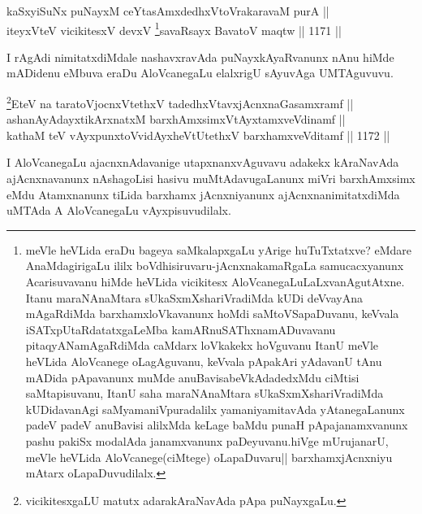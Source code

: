 
\begin{shl}
kaSxyiSuNx puNayxM ceYtasAmxdedhxVtoVrakaravaM purA ||  \\
iteyxVteV vicikitesxV devxV \footnote{meVle heVLida eraDu bageya saMkalapxgaLu yArige huTuTxtatxve? eMdare AnaMdagirigaLu ililx boVdhisiruvaru-jAcnxnakamaRgaLa samucacxyanunx Acarisuvavanu hiMde heVLida vicikitesx AloVcanegaLuLaLxvanAgutAtxne. Itanu maraNAnaMtara sUkaSxmXshariVradiMda kUDi deVvayAna mAgaRdiMda barxhamxloVkavanunx hoMdi saMtoVSapaDuvanu, keVvala iSATxpUtaRdatatxgaLeMba kamARnuSAThxnamADuvavanu pitaqyANamAgaRdiMda caMdarx loVkakekx hoVguvanu ItanU meVle heVLida AloVcanege oLagAguvanu, keVvala pApakAri yAdavanU tAnu mADida pApavanunx muMde anuBavisabeVkAdadedxMdu ciMtisi saMtapisuvanu, ItanU saha maraNAnaMtara sUkaSxmXshariVradiMda kUDidavanAgi saMyamaniVpuradalilx yamaniyamitavAda yAtanegaLanunx padeV padeV anuBavisi alilxMda keLage baMdu punaH pApajanamxvanunx pashu pakiSx modalAda janamxvanunx paDeyuvanu.hiVge mUrujanarU, meVle heVLida AloVcanege(ciMtege) oLapaDuvaru|| barxhamxjAcnxniyu mAtarx oLapaDuvudilalx.}savaRsayx BavatoV maqtw \hfill || 1171 ||  
\end{shl}


\begin{artha}
I rAgAdi nimitatxdiMdale nashavxravAda puNayxkAyaRvanunx nAnu hiMde mADidenu eMbuva eraDu AloVcanegaLu elalxrigU sAyuvAga UMTAguvuvu.
\end{artha}


\begin{shl}
\footnote{vicikitesxgaLU matutx adarakAraNavAda pApa puNayxgaLu.}EteV na taratoV\s jocnxVtethxV tadedhxVtavxjAcnxnaGasamxramf || \\
ashanAyAdayxtikArxnatxM barxhAmxsimxVtAyxtamxveVdinamf || \\
kathaM teV vAyxpunxtoV\s vidAyxheVtUtethxV barxhamxveVditamf \hfill || 1172 ||  
\end{shl}

\begin{artha}
I AloVcanegaLu ajacnxnAdavanige utapxnanxvAguvavu adakekx kAraNavAda ajAcnxnavanunx nAshagoLisi hasivu muMtAdavugaLanunx miVri barxhAmxsimx eMdu Atamxnanunx tiLida barxhamx jAcnxniyanunx ajAcnxnanimitatxdiMda uMTAda A AloVcanegaLu vAyxpisuvudilalx.
\end{artha}



